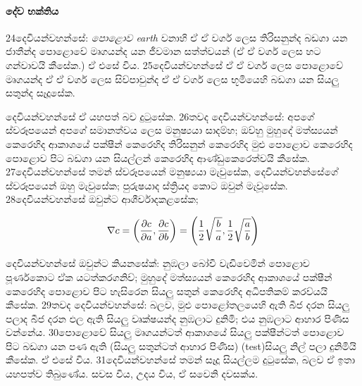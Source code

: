 \documentclass[10pt]{book}
\begin{document}
\paragraph{දේව භක්තිය} 
  \textsf{24දෙවියන්වහන්සේ: \textit{පොළොව earth}  වනාහි ඒ ඒ වර්ග ලෙස තිරිසනුන්ද බඩගා යන ජාතීන්ද පොළොවේ මෘගයන්ද යන ජීවමාන සත්ත්වයන් (ඒ ඒ වර්ග ලෙස හට ගන්වාවයි කීසේක.) ඒ එසේ විය. 25දෙවියන්වහන්සේ ඒ ඒ වර්ග ලෙස පොළොවේ මෘගයන්ද ඒ ඒ වර්ග ලෙස සිව්පාවුන්ද ඒ ඒ වර්ග ලෙස භූමියෙහි බඩගා යන සියලු සතුන්ද සෑදූසේක.} \\

\begin{center}
\end{center}
 
දෙවියන්වහන්සේ ඒ යහපත් බව දුටුසේක. 26තවද දෙවියන්වහන්සේ: අපගේ ස්වරූපයෙන් අපගේ සමානත්වය ලෙස මනුෂ්‍යයා සාදම්හ; ඔව්හු මුහුදේ මත්ස්‍යයන් කෙරෙහිද ආකාශයේ පක්ෂීන් කෙරෙහිද තිරිසනුන් කෙරෙහිද මුළු පොළොව කෙරෙහිද පොළොව පිට බඩගා යන සියල්ලන් කෙරෙහිද ආණ්ඩුකෙරෙත්වයි කීසේක. 27දෙවියන්වහන්සේ තමන් ස්වරූපයෙන් මනුෂ්‍යයා මැවුසේක, දෙවියන්වහන්සේගේ ස්වරූපයෙන් ඔහු මැවුසේක; පුරුෂයාද ස්ත්‍රියද කොට ඔවුන් මැවූසේක. 28දෙවියන්වහන්සේ ඔවුන්ට ආශීර්වාදකළසේක;

\begin{equation}
\nabla c=\left({\partial c\over \partial a}, {\partial c\over \partial b}\right)=\left({1\over 2}\sqrt{b\over a},{1\over 2}\sqrt{a\over b}\right)
\end{equation}

 දෙවියන්වහන්සේ ඔවුන්ට කියනසේක්: නුඹලා බෝවී වැඩිවෙමින් පොළොව පූර්ණකොට ඒක යටත්කරගනිව්; මුහුදේ මත්ස්‍යයන් කෙරෙහිද ආකාශයේ පක්ෂීන් කෙරෙහිද පොළොව පිට හැසිරෙන සියලු සතුන් කෙරෙහිද අධිපතිකම් කරව්යයි කීසේක. 29තවද දෙවියන්වහන්සේ: බලව, මුළු පොළෝතලයෙහි ඇති බීජ දරන සියලු පලාද බීජ දරන ඵල ඇති සියලු වෘක්ෂයන්ද නුඹලාට දුනිමි; එය නුඹලාට ආහාර පිණිස වන්නේය. 30පොළොවේ සියලු මෘගයන්ටත් ආකාශයේ සියලු පක්ෂීන්ටත් පොළොව පිට බඩගා යන පණ ඇති (සියලු සතුන්ටත් ආහාර පිණිස) (test)සියලු නිල් පලා දුනිමියි කීසේක. ඒ එසේ විය. 31දෙවියන්වහන්සේ තමන් සෑදූ සියල්ලම දුටුසේක, බලව ඒ ඉතා යහපත්ව තිබුණේය. සවස විය, උදය විය, ඒ සවෙනි දවසක්ය. 
 
\end{document}
